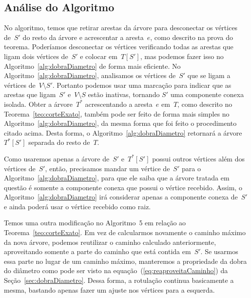 		\bigskip

		\subsection*{Análise do Algoritmo}


		No algoritmo, temos que 
		retirar arestas da árvore para 
		desconectar os vértices de~$S'$ do resto da árvore
		e acrescentar a aresta~$e$, como descrito na prova do teorema.
		Poderíamos desconectar os vértices verificando todas as arestas que 
		ligam dois vértices de~$S'$ e colocar em~$T[S']$, mas podemos
		fazer isso no Algoritmo~\ref{alg:dobraDiametro} de forma 
		mais eficiente. 
		No Algoritmo~\ref{alg:dobraDiametro},
		analisamos os vértices de~$S'$ que se ligam a vértices 
		de~$V\setminus S'$. 
		Portanto podemos usar uma marcação para indicar que as 
		arestas que ligam~$S'$ e~${V\setminus S}$ estão inativas, 
		tornando $S'$ uma componente conexa isolada. 
		Obter a árvore~$T^*$ acrescentando a aresta~$e$ em~$T$, como descrito no
		Teorema~\ref{teo:corteExato}, também pode ser feito de 
		forma mais simples no Algoritmo~\ref{alg:dobraDiametro},
		da mesma forma que foi feito o procedimento citado acima.
		Desta forma, o Algoritmo~\ref{alg:dobraDiametro} retornará
		a árvore~$T^*[S']$ separada do resto de~$T$.

		Como usaremos apenas a árvore de~$S'$ e~$T^*[S']$ possui outros 
		vértices além dos vértices de~$S'$,
		então, precisamos mandar um vértice de~$S'$ para
		o Algoritmo~\ref{alg:dobraDiametro},
		para que ele saiba que a árvore tratada em questão é
		somente a componente conexa que possui o vértice recebido.
		Assim, o Algoritmo~\ref{alg:dobraDiametro} irá considerar
		apenas a componente conexa de~$S'$ e ainda
		poderá usar o vértice recebido como raiz.


		Temos uma outra modificação no 
		Algoritmo~5   
		em relação ao Teorema~\ref{teo:corteExato}.
		Em vez de calcularmos novamente o caminho máximo da nova
		árvore, podemos reutilizar o caminho calculado anteriormente,
		aproveitando somente a parte do caminho que está contida 
		em~$S'$. 
		Se usarmos essa parte no lugar de um caminho máximo,
		manteremos a propriedade da dobra do diâmetro como pode
		ser visto na equação~(\ref{eq:reaproveitaCaminho}) da 
		Seção~\ref{sec:dobraDiametro}. 
		Dessa forma, a rotulação continua basicamente a mesma,
		bastando apenas fazer um ajuste nos vértices para a esquerda.

